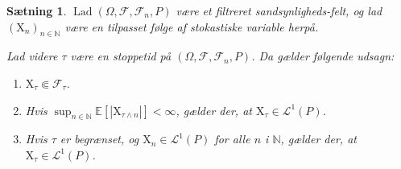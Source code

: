 \documentclass{article}
\newcommand{\1}{\mathbbm{1}}
\theoremstyle{boxed}
\newtheorem{proposition}[theorem]{Sætning}
\begin{document}
\begin{theorem-box}
    \begin{proposition}
        $\operatorname{Lad}\left(\Omega, \mathcal{F}, \mathcal{F}_n, P\right)$ være et filtreret sandsynligheds-felt, og lad $\left(\mathrm{X}_n\right)_{n \in \mathbb{N}}$ være en tilpasset følge af stokastiske variable herpå.

Lad videre $\tau$ være en stoppetid på $\left(\Omega, \mathcal{F}, \mathcal{F}_n, P\right)$.
Da gælder følgende udsagn:
\begin{enumerate}
    \item[\textnormal{(i)}] $\mathrm{X}_\tau \Subset \mathcal{F}_\tau$.
    \item[\textnormal{(ii)}]Hvis $\sup _{n \in \mathbb{N}} \mathbb{E}\left[\left|\mathrm{X}_{\tau \wedge n}\right|\right]<\infty$, gælder der, at $\mathrm{X}_\tau \in \mathcal{L}^1(P)$.
    \item[\textnormal{(iii)}]Hvis $\tau$ er begrænset, og $\mathrm{X}_n \in \mathcal{L}^1(P)$ for alle $n$ i $\mathbb{N}$, gælder der, at $\mathrm{X}_\tau \in \mathcal{L}^1(P)$.
\end{enumerate}
    \end{proposition}
\end{theorem-box}
\end{document}
